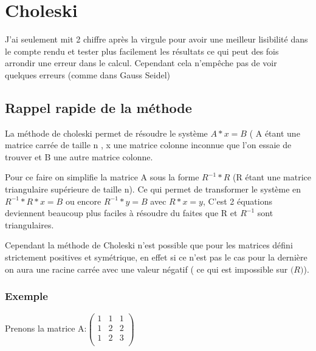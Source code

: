 \documentclass[12pt]{article}
\begin{document}
\newpage


\section{Choleski}

J'ai seulement mit 2 chiffre après la virgule pour avoir une meilleur lisibilité dans le compte rendu et tester plus facilement les résultats ce qui peut des fois arrondir une erreur dans le calcul. Cependant cela n'empêche pas de voir quelques erreurs (comme dans Gauss Seidel)

\subsection{Rappel rapide de la méthode}



\begin{multicols}{2}

  La méthode de choleski permet de résoudre le système $A*x = B$ ( A étant une matrice carrée de taille n , x une matrice colonne inconnue que l’on essaie de trouver et B une autre matrice colonne.


  Pour ce faire on simplifie la matrice A sous la forme $R^{-1}*R$ (R étant une matrice triangulaire supérieure de taille n). Ce qui permet de transformer le système en $R^{-1}*R*x = B$ ou encore $R^{-1}*y = B$ avec $R*x = y$, C’est 2 équations deviennent beaucoup plus faciles à résoudre du faites que R et $R^{-1}$ sont triangulaires.


  Cependant la méthode de Choleski n’est possible que pour les matrices défini strictement positives et symétrique, en effet si ce n’est pas le cas pour la dernière on aura une racine carrée avec une valeur négatif ( ce qui est impossible sur $\mathds(R)$).

\end {multicols}

\subsubsection{Exemple}

Prenons la matrice A:$
  \begin{pmatrix}
 
    1 & 1 & 1 \\

    1 & 2 & 2 \\

    1 & 2 & 3 \\

  \end{pmatrix}
  $
\end{document}
